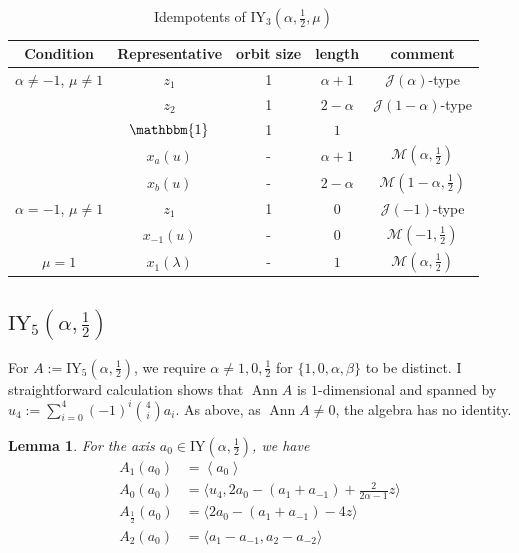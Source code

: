 \documentclass[11pt, a4paper]{article}
\theoremstyle{plain}
\newtheorem{lemma}[theorem]{Lemma}
\theoremstyle{definition}
\newcommand\al{\alpha}
\newcommand\bt{\beta}
\newcommand\lm{\lambda}
\newcommand\cJ{\mathcal{J}}
\newcommand\cM{\mathcal{M}}
\newcommand\la{\langle}
\newcommand\ra{\rangle}
\DeclareMathOperator{\Ann}{Ann}
\newcommand{\IY}{\mathrm{IY}}
\newcommand{\0}{\overline{0}}
\newcommand{\2}{\overline{2}}
\newcommand{\1}{\mathbbm{1}}
\begin{document}
\begin{table}[h!tb]
	\renewcommand{\arraystretch}{1.3}
	\begin{tabular}{ccccc}
		\hline
		Condition & Representative & orbit size & length & comment \\
		\hline
$\al \neq -1$, $\mu \neq 1$ &	$z_1$ & 1 & $\al+1$ & $\cJ(\al)$-type \\
&		$z_2$ & 1 & $2-\al$ & $\cJ(1-\al)$-type \\
&		$\1$ & 1 & $1$ &  \\
&		$x_a(u)$ & - & $\al+1$ & $\cM(\al, \frac{1}{2})$ \\
&		$x_b(u)$ & - & $2-\al$ & $\cM(1-\al, \frac{1}{2})$ \\
		\hline
$\al = -1$, $\mu \neq 1$ & $z_1$ & 1 & $0$ & $\cJ(-1)$-type \\
&		$x_{-1}(u)$ & - & $0$ & $\cM(-1, \frac{1}{2})$ \\
		\hline
$\mu = 1$ & $x_1(\lm)$ & - & $1$ & $\cM(\al,\frac{1}{2})$
	\end{tabular}
	\caption{Idempotents of $\IY_3(\al, \frac{1}{2}, \mu)$}\label{tab:IY3idempotents}
\end{table}






\subsection{$\IY_5(\al, \frac{1}{2})$}\label{sec:IY5}

For $A:= \IY_5(\al, \frac{1}{2})$, we require $\al \neq 1,0,\frac{1}{2}$ for $\{ 1,0,\al,\bt\}$ to be distinct.  I straightforward calculation shows that $\Ann A$ is $1$-dimensional and spanned by $u_4 := \sum_{i=0}^4 (-1)^i \binom{4}{i} a_i$.  As above, as $\Ann A \neq 0$, the algebra has no identity.

\begin{lemma}
	For the axis $a_0 \in \IY(\al,\frac{1}{2})$, we have
	\begin{align*}
		A_1(a_0) &= \left\la a_0 \right\ra  \\
		A_0(a_0) &= \la u_4, 2a_0 - (a_1+a_{-1}) +\tfrac{2}{2\al-1}z \ra \\
		A_{\frac{1}{2}}(a_0) &= \la 2a_0 - (a_1+a_{-1}) - 4z \ra \\
		A_{2}(a_0) &= \la a_1-a_{-1}, a_2 - a_{-2} \ra 
	\end{align*}
\end{lemma}
\end{document}
